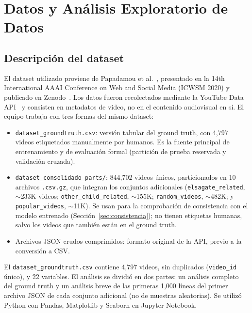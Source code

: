 \documentclass[conference]{IEEEtran}
\begin{document}
\section{Datos y Análisis Exploratorio de Datos}

\subsection{Descripción del dataset}\label{sec:desc}
El dataset utilizado proviene de Papadamou et al.~\cite{papadamou}, presentado en la 14th International AAAI Conference on Web and Social Media (ICWSM 2020) y publicado en Zenodo~\cite{papadamou_data}. Los datos fueron recolectados mediante la YouTube Data API~\cite{ytapi} y consisten en metadatos de video, no en el contenido audiovisual en sí. El equipo trabaja con tres formas del mismo dataset:
\begin{itemize}
\item \texttt{dataset\_groundtruth.csv}: versión tabular del ground truth, con 4,797 videos etiquetados manualmente por humanos. Es la fuente principal de entrenamiento y de evaluación formal (partición de prueba reservada y validación cruzada).
\item \texttt{dataset\_consolidado\_parts/}: 844,702 videos únicos, particionados en 10 archivos \texttt{.csv.gz}, que integran los conjuntos adicionales (\texttt{elsagate\_related}, ${\sim}$233K videos; \texttt{other\_child\_related}, ${\sim}$155K; \texttt{random\_videos}, ${\sim}$482K; y \texttt{popular\_videos}, ${\sim}$11K). Se usan para la comprobación de consistencia con el modelo entrenado (Sección~\ref{sec:consistencia}); no tienen etiquetas humanas, salvo los videos que también están en el ground truth.
\item Archivos JSON crudos comprimidos: formato original de la API, previo a la conversión a CSV.
\end{itemize}
El \texttt{dataset\_groundtruth.csv} contiene 4,797 videos, sin duplicados (\texttt{video\_id} único), y 22 variables. El análisis se dividió en dos partes: un análisis completo del ground truth y un análisis breve de las primeras 1,000 líneas del primer archivo JSON de cada conjunto adicional (no de muestras aleatorias). Se utilizó Python con Pandas, Matplotlib y Seaborn en Jupyter Notebook.

\end{document}
